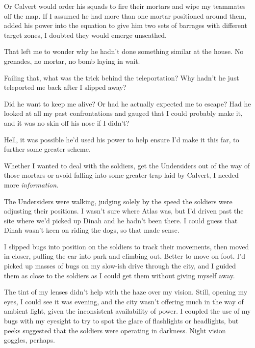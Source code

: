 Or Calvert would order his squads to fire their mortars and wipe my teammates off the map.  If I assumed he had more than one mortar positioned around them, added his power into the equation to give him two sets of barrages with different target zones, I doubted they would emerge unscathed.



That left me to wonder why he hadn't done something similar at the house.  No grenades, no mortar, no bomb laying in wait.



Failing that, what was the trick behind the teleportation?  Why hadn't he just teleported me back after I slipped away?



Did he want to keep me alive?  Or had he actually expected me to escape?  Had he looked at all my past confrontations and gauged that I could probably make it, and it was no skin off his nose if I didn't?



Hell, it was possible he'd used his power to help ensure I'd make it this far, to further some greater scheme.



Whether I wanted to deal with the soldiers, get the Undersiders out of the way of those mortars or avoid falling into some greater trap laid by Calvert, I needed more \emph{information}.



The Undersiders were walking, judging solely by the speed the soldiers were adjusting their positions.  I wasn't sure where Atlas was, but I'd driven past the site where we'd picked up Dinah and he hadn't been there.  I could guess that Dinah wasn't keen on riding the dogs, so that made sense.



I slipped bugs into position on the soldiers to track their movements, then moved in closer, pulling the car into park and climbing out.  Better to move on foot.  I'd picked up masses of bugs on my slow-ish drive through the city, and I guided them as close to the soldiers as I could get them without giving myself away.



The tint of my lenses didn't help with the haze over my vision.  Still, opening my eyes, I could see it was evening, and the city wasn't offering much in the way of ambient light, given the inconsistent availability of power.  I coupled the use of my bugs with my eyesight to try to spot the glare of flashlights or headlights, but peeks suggested that the soldiers were operating in darkness.  Night vision goggles, perhaps.



